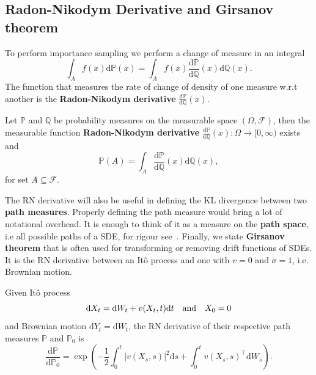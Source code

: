 \subsection{Radon-Nikodym Derivative and Girsanov theorem}
To perform importance sampling we perform a change of measure in an integral
\begin{equation}
	\int_{A} f(x) \mathrm{d} \mathbb{P}(x)=\int_{A} f(x) \frac{\mathrm{d} \mathbb{P}}{\mathrm{d} \mathbb{Q}}(x) \mathrm{d} \mathbb{Q}(x).
\end{equation}
The function that measures the rate of change of density of one measure w.r.t another is the \textbf{Radon-Nikodym derivative} $\frac{\mathrm{d} \mathbb{P}}{\mathrm{d} \mathbb{Q}}(x)$.

\begin{theorem}
	Let $\mathbb{P}$ and $\mathbb{Q}$ be probability measures on the measurable space $(\Omega, \mathcal{F})$, then the measurable function \textbf{Radon-Nikodym derivative} $\frac{\mathrm{d} \mathbb{P}}{\mathrm{d} \mathbb{Q}}(x): \Omega \rightarrow[0, \infty)$ exists and 
	\begin{equation}
		\mathbb{P}(A)=\int_{A} \frac{\mathrm{d} \mathbb{P}}{\mathrm{d} \mathbb{Q}}(x) \mathrm{d} \mathbb{Q}(x),
	\end{equation}
	for set $A \subseteq \mathcal{F}$.
\end{theorem}
The RN derivative will also be useful in defining the KL divergence between two \textbf{path measures}. Properly defining the path measure would bring a lot of notational overhead. It is enough to think of it as a measure on the \textbf{path space}, i.e all possible paths of a SDE, for rigour see~\cite{leonard2014pathmeasure}. 
Finally, we state \textbf{Girsanov theorem} that is often used for transforming or removing drift functions of SDEs. It is the RN derivative between an It\^ o process and one with $v = 0$ and $\sigma = 1$, i.e. Brownian motion. 
\begin{theorem}
	Given It\^ o process
	\begin{equation}
		\mathrm{d}X_t = \mathrm{d}W_t + v(X_t, t)\mathrm{d}t \quad \text{and} \quad X_0 = 0 \\
	\end{equation}
	and Brownian motion $\mathrm{d}Y_t = \mathrm{d}W_t$, the RN derivative of their respective path measures $\mathbb{P}$ and $\mathbb{P}_0$	is
	\begin{equation}
		\label{eq:Girsanov_theorem}
		\frac{\mathrm{d} \mathbb{P}}{\mathrm{d} \mathbb{P}_0}=
		\exp \left(
		-\frac{1}{2} \int_{0}^{t}\left|v(X_s, s)\right|^{2} \mathrm{d} s+\int_{0}^{t} v(X_s, s)^{\top} \mathrm{d} W_s\right).
	\end{equation}
\end{theorem}

